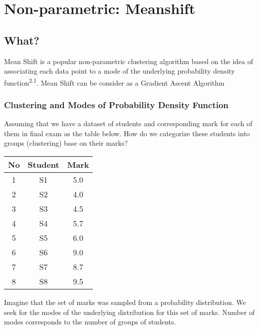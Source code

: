 \section{Non-parametric: Meanshift}

\subsection{What?}
Mean Shift  is a popular non-parametric clustering algorithm based on the
idea of associating each data point to a mode of the underlying probability density
function\textsuperscript{2.1}. Mean Shift can be consider as a Gradient Ascent Algorithm
\subsubsection{Clustering and Modes of Probability Density Function}

Assuming that we have a dataset of students and corresponding mark for each of them 
in final exam as the table below. How do we categorize these students into groups (clustering) base on their marks?
\begin{center}
 \begin{tabular}{||c c c||} 
 \hline
 No & Student & Mark \\ [0.5ex] 
 \hline\hline
 1 & S1 & 5.0 \\ 
 \hline
 2 & S2 & 4.0 \\
 \hline
 3 & S3 & 4.5 \\
 \hline
 4 & S4 & 5.7 \\
 \hline
 5 & S5 & 6.0 \\ 
  \hline
 6 & S6 & 9.0 \\ 
  \hline
 7 & S7 & 8.7 \\ 
  \hline
 8 & S8 & 9.5 \\ 
 [1ex] 
 \hline
\end{tabular}
\end{center}

Imagine that the set of marks was sampled from a probability distribution. We seek for the modes of  the underlying distribution for this set of marks. Number of modes corresponds to the number of groups of students.

